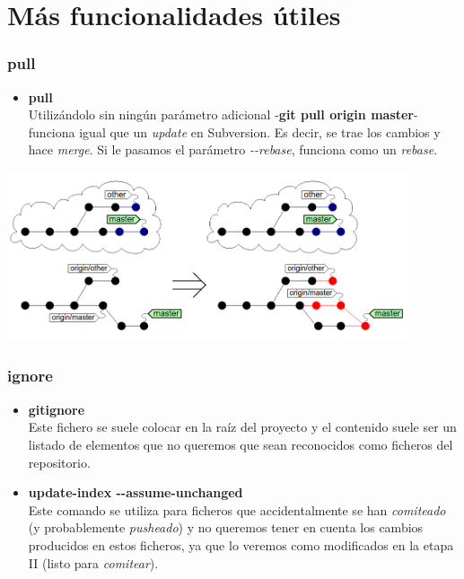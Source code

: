 \section{Más funcionalidades útiles}
\frame
{
\frametitle{pull}
\begin{itemize}
 \item \textbf{pull}\\ \indent
Utilizándolo sin ningún parámetro adicional -\textbf{git pull origin master}- funciona igual que un \textit{update} en Subversion. Es decir, se trae los cambios y hace \textit{merge}. Si le pasamos el parámetro \textit{-{}-rebase}, funciona como un \textit{rebase}.
\end{itemize}

\includegraphics[height=5cm]{imgs/pull.png} 
}

\frame
{
\frametitle{ignore}
\begin{itemize}
 \item \textbf{gitignore}\\ \indent
Este fichero se suele colocar en la raíz del proyecto y el contenido suele ser un listado de elementos que no queremos que sean reconocidos como ficheros del repositorio. 
 \item \textbf{update-index -{}-assume-unchanged}\\ \indent
Este comando se utiliza para ficheros que accidentalmente se han \textit{comiteado} (y probablemente \textit{pusheado}) y no queremos tener en cuenta los cambios producidos en estos ficheros, ya que lo veremos como modificados en la etapa II (listo para \textit{comitear}).
\end{itemize}
}

